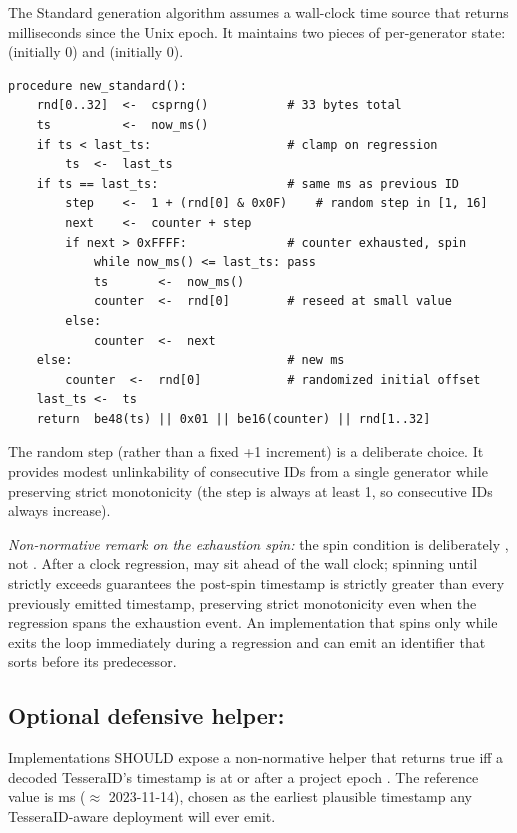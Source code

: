 The Standard generation algorithm assumes a wall-clock time source that returns milliseconds since the Unix epoch. It maintains two pieces of per-generator state:  (initially 0) and  (initially 0).

\begin{lstlisting}[language=Pseudocode,caption={Standard TesseraID generation},label={lst:gen-std}]
procedure new_standard():
    rnd[0..32]  <-  csprng()           # 33 bytes total
    ts          <-  now_ms()
    if ts < last_ts:                   # clamp on regression
        ts  <-  last_ts
    if ts == last_ts:                  # same ms as previous ID
        step    <-  1 + (rnd[0] & 0x0F)    # random step in [1, 16]
        next    <-  counter + step
        if next > 0xFFFF:              # counter exhausted, spin
            while now_ms() <= last_ts: pass
            ts       <-  now_ms()
            counter  <-  rnd[0]        # reseed at small value
        else:
            counter  <-  next
    else:                              # new ms
        counter  <-  rnd[0]            # randomized initial offset
    last_ts <-  ts
    return  be48(ts) || 0x01 || be16(counter) || rnd[1..32]
\end{lstlisting}

The random step (rather than a fixed +1 increment) is a deliberate choice. It provides modest unlinkability of consecutive IDs from a single generator while preserving strict monotonicity (the step is always at least 1, so consecutive IDs always increase).

\emph{Non-normative remark on the exhaustion spin:} the spin condition  is deliberately \code{<=}, not \code{==}. After a clock regression,  may sit ahead of the wall clock; spinning until  strictly exceeds  guarantees the post-spin timestamp is strictly greater than every previously emitted timestamp, preserving strict monotonicity even when the regression spans the exhaustion event. An implementation that spins only while  exits the loop immediately during a regression and can emit an identifier that sorts before its predecessor.

\subsection{Optional defensive helper: }
\label{sec:min-timestamp}

Implementations SHOULD expose a non-normative helper that returns true iff a decoded TesseraID's timestamp is at or after a project epoch . The reference value is  ms ($\approx$ 2023-11-14), chosen as the earliest plausible timestamp any TesseraID-aware deployment will ever emit.

